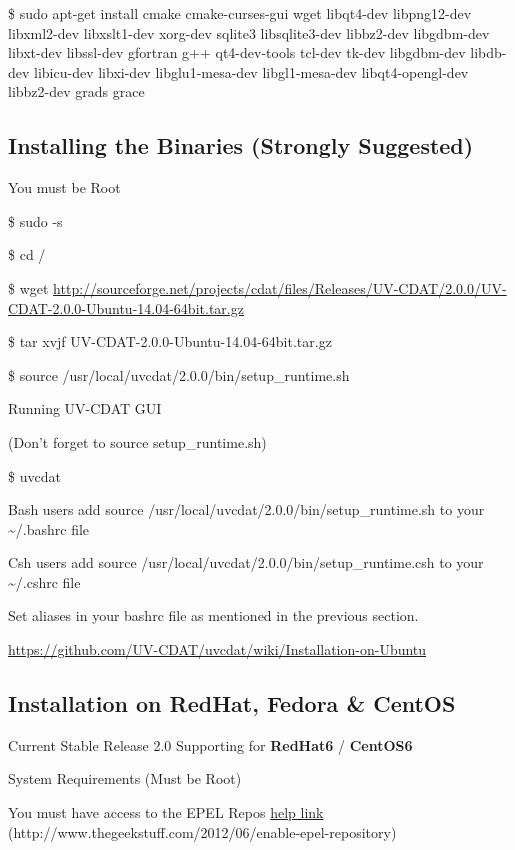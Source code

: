 \documentclass[letterpaper,10pt,english]{sphinxmanual}
\begin{document}
\$ sudo apt-get install cmake cmake-curses-gui wget libqt4-dev libpng12-dev libxml2-dev libxslt1-dev xorg-dev sqlite3 libsqlite3-dev libbz2-dev libgdbm-dev libxt-dev libssl-dev gfortran g++ qt4-dev-tools tcl-dev tk-dev libgdbm-dev libdb-dev libicu-dev libxi-dev libglu1-mesa-dev libgl1-mesa-dev libqt4-opengl-dev libbz2-dev grads grace


\subsection{Installing the Binaries (Strongly Suggested)}
\label{getting_started:installing-the-binaries-strongly-suggested}
You must be Root

\$ sudo -s

\$ cd /

\$ wget \href{http://sourceforge.net/projects/cdat/files/Releases/UV-CDAT/2.0.0/UV-CDAT-2.0.0-Ubuntu-14.04-64bit.tar.gz}{http://sourceforge.net/projects/cdat/files/Releases/UV-CDAT/2.0.0/UV-CDAT-2.0.0-Ubuntu-14.04-64bit.tar.gz}

\$ tar xvjf UV-CDAT-2.0.0-Ubuntu-14.04-64bit.tar.gz

\$ source /usr/local/uvcdat/2.0.0/bin/setup\_runtime.sh

Running UV-CDAT GUI

(Don't forget to source setup\_runtime.sh)

\$ uvcdat

Bash users add source /usr/local/uvcdat/2.0.0/bin/setup\_runtime.sh to your \textasciitilde{}/.bashrc file

Csh users add source /usr/local/uvcdat/2.0.0/bin/setup\_runtime.csh to your \textasciitilde{}/.cshrc file

Set aliases in your bashrc file as mentioned in the previous section.

\href{https://github.com/UV-CDAT/uvcdat/wiki/Installation-on-Ubuntu}{https://github.com/UV-CDAT/uvcdat/wiki/Installation-on-Ubuntu}


\subsection{Installation on RedHat, Fedora \& CentOS}
\label{getting_started:installation-on-redhat-fedora-centos}
Current Stable Release 2.0 Supporting for \textbf{RedHat6} / \textbf{CentOS6}

System Requirements (Must be Root)

You must have access to the EPEL Repos \href{http://www.thegeekstuff.com/2012/06/enable-epel-repository}{help link} (http://www.thegeekstuff.com/2012/06/enable-epel-repository)
\end{document}
